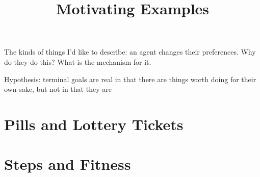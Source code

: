 \documentclass{article}
\title{Motivating Examples}
\begin{document}
	The kinds of things I'd like to describe: an agent changes their preferences. Why do they do this? What is the mechanism for it. 
	
	Hypothesis: terminal goals are real in that there are things worth doing for their own sake, but not in that they are
	
	\section{Pills and Lottery Tickets}
	\section{Steps and Fitness}
\end{document}
